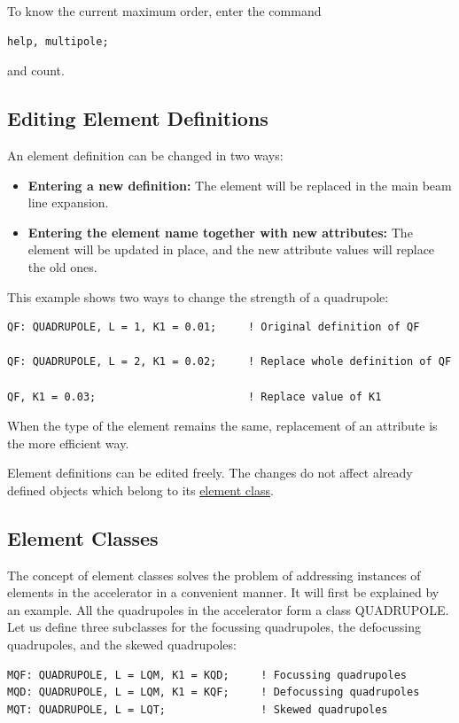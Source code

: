 To know the current maximum order, enter the command 
\begin{verbatim}
help, multipole;
\end{verbatim} 
and count. 


%
\subsection{Editing Element Definitions}  
An element definition can be changed in two ways: 
\begin{itemize}
   \item \textbf{Entering a new definition:} The element will be
     replaced in the main beam line expansion.  
   \item \textbf{Entering the element name together with new
     attributes:} The element will be updated in place, and the new
     attribute values will replace the old ones.  
\end{itemize} 

This example shows two ways to change the strength of a quadrupole: 
\begin{verbatim}
QF: QUADRUPOLE, L = 1, K1 = 0.01;     ! Original definition of QF

QF: QUADRUPOLE, L = 2, K1 = 0.02;     ! Replace whole definition of QF

QF, K1 = 0.03;                        ! Replace value of K1
\end{verbatim} 

When the type of the element remains the same, replacement of an
attribute is the more efficient way.  

Element definitions can be edited freely. The changes do not affect
already defined objects which belong to its
\href{elm_class.html}{element class}.  



%
\subsection{Element Classes}  
\label{sec:element_classes}
The concept of element classes solves the problem of addressing
instances of elements in the accelerator in a convenient manner. It will
first be explained by an example. All the quadrupoles in the accelerator
form a class QUADRUPOLE. Let us define three subclasses for the
focussing quadrupoles, the defocussing quadrupoles, and the skewed
quadrupoles:  
\begin{verbatim}
MQF: QUADRUPOLE, L = LQM, K1 = KQD;     ! Focussing quadrupoles
MQD: QUADRUPOLE, L = LQM, K1 = KQF;     ! Defocussing quadrupoles
MQT: QUADRUPOLE, L = LQT;               ! Skewed quadrupoles
\end{verbatim} 

